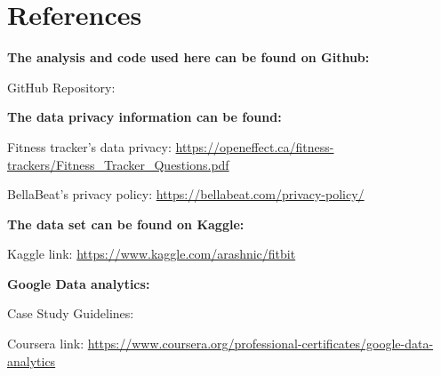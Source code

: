 \documentclass[
]{article}
\begin{document}
\hypertarget{references}{%
\section{References}\label{references}}

\textbf{The analysis and code used here can be found on Github:}

GitHub Repository:

\textbf{The data privacy information can be found:}

Fitness tracker's data privacy:
\url{https://openeffect.ca/fitness-trackers/Fitness_Tracker_Questions.pdf}

BellaBeat's privacy policy: \url{https://bellabeat.com/privacy-policy/}

\textbf{The data set can be found on Kaggle:}

Kaggle link: \url{https://www.kaggle.com/arashnic/fitbit}

\textbf{Google Data analytics:}

Case Study Guidelines:

Coursera link:
\url{https://www.coursera.org/professional-certificates/google-data-analytics}
\end{document}
